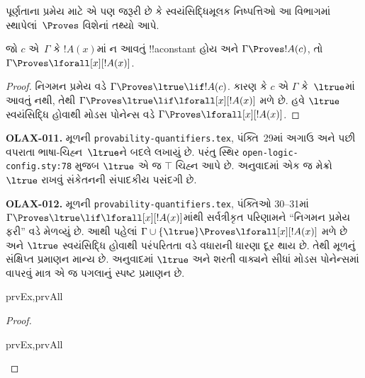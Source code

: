 \documentclass[../../../include/open-logic-section]{subfiles}
\begin{document}


\begin{explain}
  પૂર્ણતાના પ્રમેય માટે એ પણ જરૂરી છે કે સ્વયંસિદ્ધિમૂલક નિષ્પત્તિઓ
  આ વિભાગમાં સ્થાપેલાં~$\Proves$ વિશેનાં તથ્યો આપે.
\end{explain}

\begin{thm}
 જો $c$ એ~$\Gamma$ કે $!A(x)$માં ન
આવતું !!a{constant} હોય અને $\Gamma \Proves !A(c)$, તો
$\Gamma \Proves \lforall[x][!A(x)]$.
\end{thm}

\begin{proof}
નિગમન પ્રમેય વડે $\Gamma \Proves \ltrue \lif !A(c)$. કારણ કે $c$ એ
$\Gamma$ કે~$\ltrue$માં આવતું નથી, તેથી
$\Gamma \Proves \ltrue \lif \lforall[x][!A(x)]$ મળે છે. હવે
$\ltrue$ સ્વયંસિદ્ધિ હોવાથી મોડસ પોનેન્સ વડે
$\Gamma \Proves \lforall[x][!A(x)]$.
\end{proof}

\begin{editorial}
\textbf{OLAX-011.} મૂળની \texttt{provability-quantifiers.tex}, પંક્તિ~29માં અગાઉ અને પછી વપરાતા ભાષા-ચિહ્ન~$\ltrue$ને બદલે \texttt{\string\top} લખાયું છે. પરંતુ સ્થિર \texttt{open-logic-config.sty:78} મુજબ $\ltrue$ એ જ $\top$ ચિહ્ન આપે છે. અનુવાદમાં એક જ મેક્રો $\ltrue$ રાખવું સંકેતનની સંપાદકીય પસંદગી છે.
\end{editorial}

\begin{editorial}
\textbf{OLAX-012.} મૂળની \texttt{provability-quantifiers.tex}, પંક્તિઓ 30--31માં $\Gamma\Proves\ltrue\lif\lforall[x][!A(x)]$માંથી સર્વત્રીકૃત પરિણામને ``નિગમન પ્રમેય ફરી'' વડે મેળવ્યું છે. આથી પહેલાં $\Gamma\cup\{\ltrue\}\Proves\lforall[x][!A(x)]$ મળે છે અને $\ltrue$ સ્વયંસિદ્ધિ હોવાથી પરંપરિતતા વડે વધારાની ધારણા દૂર થાય છે. તેથી મૂળનું સંક્ષિપ્ત પ્રમાણન માન્ય છે. અનુવાદમાં $\ltrue$ અને શરતી વાક્યને સીધાં મોડસ પોનેન્સમાં વાપરવું માત્ર એ જ પગલાનું સ્પષ્ટ પ્રમાણન છે.
\end{editorial}

\begin{prop}
\begin{tagenumerate}{prvEx,prvAll}

\end{tagenumerate}
\end{prop}

\begin{proof}
\begin{tagenumerate}{prvEx,prvAll}
\end{tagenumerate}
\end{proof}
\end{document}
